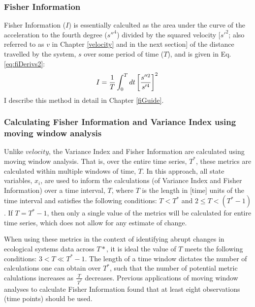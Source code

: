 \documentclass[12pt,twoside,openany]{reedthesis}
\begin{document}
\subsubsection{Fisher Information}\label{fisher-information}

Fisher Information (\(I\)) is essentially calculted as the area under
the curve of the acceleration to the fourth degree (\(s''^4\)) divided
by the squared velocity {[}\(s'^2\); also referred to as \(v\) in
Chapter \ref{velocity} and in the next section{]} of the distance
travelled by the system, \(s\) over some period of time (\(T\)), and is
given in Eq. \eqref{eq:fiDerivs2}:
\begin{equation}   
    I = \frac{1}{T} \int_0^T dt\left[\frac{s''^2}{s'^4}\right]^2 \\  
  \label{eq:fiDerivs2}  
\end{equation}
I describe this method in detail in Chapter \ref{fiGuide}.

\subsubsection{Calculating Fisher Information and Variance Index using
moving window
analysis}\label{calculating-fisher-information-and-variance-index-using-moving-window-analysis}

Unlike \(velocity\), the Variance Index and Fisher Information are
calculated using moving window analysis. That is, over the entire time
series, \(T^*\), these metrics are calculated within multiple windows of
time, \(T\). In this approach, all state variables, \(x_i\), are used to
inform the calculations (of Variance Index and Fisher Information) over
a time interval, \(T\), where \(T\) is the length in {[}time{]} units of
the time interval and satisfies the following conditions: \(T < T^*\)
and \(2\leq T < (T^*-1)\). If \(T = T^*-1\), then only a single value of
the metrics will be calculated for entire time series, which does not
allow for any estimate of change.

When using these metrics in the context of identifying abrupt changes in
ecological systems data across \(T*\), it is ideal the value of \(T\)
meets the following conditions: \(3 < T \ll T^*-1\). The length of a
time window dictates the number of calculations one can obtain over
\(T^*\), such that the number of potential metric calulations increases
as \(\frac{T}{\ T^*}\) decreases. Previous applications of moving window
analyses to calculate Fisher Information found that at least eight
observations (time points) should be used.
\end{document}
